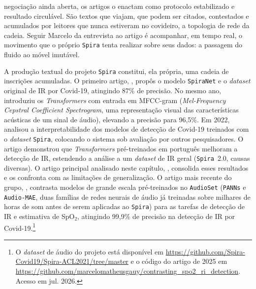 negociação ainda aberta, os artigos o enactam como protocolo estabilizado e resultado circulável. São textos que viajam, que podem ser citados, contestados e acumulados por leitores que nunca estiveram no covideiro, a topologia de rede da cadeia. Seguir Marcelo da entrevista ao artigo é acompanhar, em tempo real, o movimento que o próprio \texttt{Spira} tenta realizar sobre seus dados: a passagem do fluido ao móvel imutável.

A produção textual do projeto \texttt{Spira} constitui, ela própria, uma cadeia de inscrições acumuladas. O primeiro artigo, \textcite{Casanova2021DeepLearning}, propôs o modelo \texttt{SpiraNet} e o \textit{dataset} original de IR por Covid-19, atingindo 87\% de precisão. No mesmo ano, \textcite{Gauy2021MFCC} introduziu os \textit{Transformers} com entrada em MFCC-gram (\textit{Mel-Frequency Cepstral Coefficient Spectrogram}, uma representação visual das características acústicas de um sinal de áudio), elevando a precisão para 96,5\%. Em 2022, \textcite{Silva2022Interpretability} analisou a interpretabilidade dos modelos de detecção de Covid-19 treinados com o \textit{dataset} \texttt{Spira}, colocando o sistema sob avaliação por outros pesquisadores. O artigo \textcite{Gauy2023Pretrained} demonstrou que \textit{Transformers} pré-treinados em português melhoram a detecção de IR, estendendo a análise a um \textit{dataset} de IR geral (\texttt{Spira}~2.0, causas diversas). O artigo principal analisado neste capítulo, \textcite{Gauy2024Discriminant}, consolida esses resultados e os confronta com as limitações de generalização. O artigo mais recente do grupo, \textcite{Gauy2025Contrasting}, contrasta modelos de grande escala pré-treinados no \texttt{AudioSet} (\texttt{PANNs} e \texttt{\texttt{Audio-MAE}}, duas famílias de redes neurais de áudio já treinadas sobre milhares de horas de som antes de serem aplicadas ao \texttt{Spira}) para as tarefas de detecção de IR e estimativa de SpO$_2$, atingindo 99,9\% de precisão na detecção de IR por Covid-19.\footnote{O \textit{dataset} de áudio do projeto está disponível em \url{https://github.com/Spira-Covid19/Spira-ACL2021/tree/master} e o código do artigo de 2025 em \url{https://github.com/marcelomatheusgauy/contrasting_spo2_ri_detection}. Acesso em jul. 2026.}

